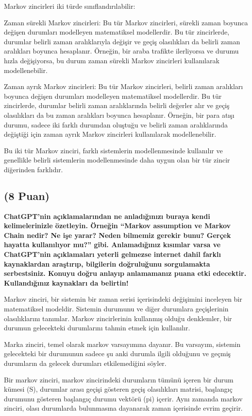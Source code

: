 \documentclass[11pt]{article}
\begin{document}
Markov zincirleri iki türde sınıflandırılabilir:

Zaman sürekli Markov zincirleri: Bu tür Markov zincirleri, sürekli zaman boyunca değişen durumları modelleyen matematiksel modellerdir. Bu tür zincirlerde, durumlar belirli zaman aralıklarıyla değişir ve geçiş olasılıkları da belirli zaman aralıkları boyunca hesaplanır. Örneğin, bir araba trafikte ilerliyorsa ve durumu hızla değişiyorsa, bu durum zaman sürekli Markov zincirleri kullanılarak modellenebilir.

Zaman ayrık Markov zincirleri: Bu tür Markov zincirleri, belirli zaman aralıkları boyunca değişen durumları modelleyen matematiksel modellerdir. Bu tür zincirlerde, durumlar belirli zaman aralıklarında belirli değerler alır ve geçiş olasılıkları da bu zaman aralıkları boyunca hesaplanır. Örneğin, bir para atışı durumu, sadece iki farklı durumdan oluştuğu ve belirli zaman aralıklarında değiştiği için zaman ayrık Markov zincirleri kullanılarak modellenebilir.

Bu iki tür Markov zinciri, farklı sistemlerin modellenmesinde kullanılır ve genellikle belirli sistemlerin modellenmesinde daha uygun olan bir tür zincir diğerinden farklıdır.


\subsection{(8 Puan)} \textbf{ChatGPT’nin açıklamalarından ne anladığınızı buraya kendi kelimelerinizle özetleyin. Örneğin ``Markov assumption ve Markov Chain nedir? Ne işe yarar? Neden bilmemiz gerekir bunu? Gerçek hayatta kullanılıyor mu?'' gibi. Anlamadığınız kısımlar varsa ve ChatGPT’nin açıklamaları yeterli gelmezse internet dahil farklı kaynaklardan araştırıp, bilgilerin doğruluğunu sorgulamakta serbestsiniz. Konuyu doğru anlayıp anlamamanız puana etki edecektir. Kullandığınız kaynakları da belirtin!}

Markov zinciri, bir sistemin bir zaman serisi içerisindeki değişimini inceleyen bir matematiksel modeldir. Sistemin durumunu ve diğer durumlara geçişlerinin olasılıklarını tanımlar. Markov zincirlerinin kullanmış olduğu denklemler, bir durumun gelecekteki durumlarını tahmin etmek için kullanılır.

Marka zinciri, temel olarak markov varsayımına dayanır. Bu varsayım, sistemin gelecekteki bir durumunun sadece şu anki durumla ilgili olduğunu ve geçmiş durumların da gelecek durumları etkilemediğini söyler.

Bir markov zinciri, markov zincirindeki durumların tümünü içeren bir durum kümesi (S), durumlar arası geçişi gösteren geçiş olasılıkları matrisi, başlangıç durumunu gösteren başlangıç durumu vektörü (pi) içerir. Aynı zamanda markov zinciri, olası durumlarda bulunmasına dayanarak zaman içerisinde evrim geçirir.
\end{document}

